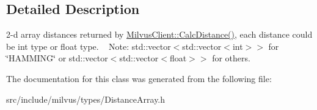 \subsection{Detailed Description}
2-\/d array distances returned by \hyperlink{classmilvus_1_1_milvus_client_a105c243c7d93ff2cd81b4d9c1751f5fb}{Milvus\+Client\+::\+Calc\+Distance()}, each distance could be int type or float type. ~\newline
Note\+: std\+::vector$<$std\+::vector$<$int$>$$>$ for \char`\"{}\+H\+A\+M\+M\+I\+N\+G\char`\"{} or std\+::vector$<$std\+::vector$<$float$>$$>$ for others. 

The documentation for this class was generated from the following file\+:\begin{DoxyCompactItemize}
\item 
src/include/milvus/types/Distance\+Array.\+h\end{DoxyCompactItemize}
